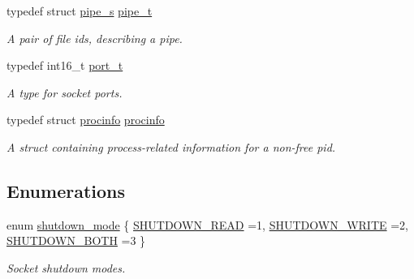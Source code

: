 \begin{DoxyCompactItemize}
typedef struct \hyperlink{structpipe__s}{pipe\+\_\+s} \hyperlink{group__syscalls_gad56b5ceaaf7d3ab88b4be7f622314dfb}{pipe\+\_\+t}
\begin{DoxyCompactList}\small\item\em A pair of file ids, describing a pipe. \end{DoxyCompactList}\item 
typedef int16\+\_\+t \hyperlink{group__syscalls_ga13894e5a2ffd5febb7aeb90e87239d61}{port\+\_\+t}
\begin{DoxyCompactList}\small\item\em A type for socket ports. \end{DoxyCompactList}\item 
typedef struct \hyperlink{structprocinfo}{procinfo} \hyperlink{group__syscalls_ga9682d9066f643f8d18cff58fd3fb09b9}{procinfo}
\begin{DoxyCompactList}\small\item\em A struct containing process-\/related information for a non-\/free pid. \end{DoxyCompactList}\end{DoxyCompactItemize}
\subsection*{Enumerations}
\begin{DoxyCompactItemize}
\item 
enum \hyperlink{group__syscalls_ga9eb10a0a72ca3149140272e9344a272b}{shutdown\+\_\+mode} \{ \hyperlink{group__syscalls_gga9eb10a0a72ca3149140272e9344a272bacbd27e0b4e3d4a02b0d833f919887d2d}{S\+H\+U\+T\+D\+O\+W\+N\+\_\+\+R\+E\+AD} =1, 
\hyperlink{group__syscalls_gga9eb10a0a72ca3149140272e9344a272ba9a7920b6a1eb57633bb981aa60edbe24}{S\+H\+U\+T\+D\+O\+W\+N\+\_\+\+W\+R\+I\+TE} =2, 
\hyperlink{group__syscalls_gga9eb10a0a72ca3149140272e9344a272bab67e72e17566af8eb432d0f3eba6d44d}{S\+H\+U\+T\+D\+O\+W\+N\+\_\+\+B\+O\+TH} =3
 \}\begin{DoxyCompactList}\small\item\em Socket shutdown modes. \end{DoxyCompactList}
\end{DoxyCompactItemize}
